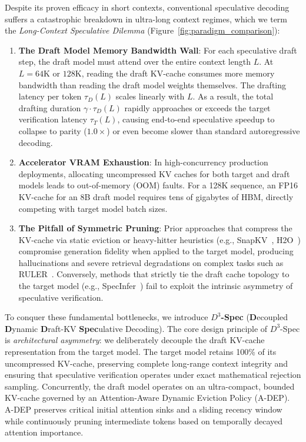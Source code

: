 \documentclass[runningheads]{llncs}
\begin{document}
Despite its proven efficacy in short contexts, conventional speculative decoding suffers a catastrophic breakdown in ultra-long context regimes, which we term the \textit{Long-Context Speculative Dilemma} (Figure~\ref{fig:paradigm_comparison}):
\begin{enumerate}
    \item \textbf{The Draft Model Memory Bandwidth Wall}: For each speculative draft step, the draft model must attend over the entire context length $L$. At $L = 64\text{K}$ or $128\text{K}$, reading the draft KV-cache consumes more memory bandwidth than reading the draft model weights themselves. The drafting latency per token $\tau_D(L)$ scales linearly with $L$. As a result, the total drafting duration $\gamma \cdot \tau_D(L)$ rapidly approaches or exceeds the target verification latency $\tau_T(L)$, causing end-to-end speculative speedup to collapse to parity ($1.0\times$) or even become slower than standard autoregressive decoding.
    \item \textbf{Accelerator VRAM Exhaustion}: In high-concurrency production deployments, allocating uncompressed KV caches for both target and draft models leads to out-of-memory (OOM) faults. For a 128K sequence, an FP16 KV-cache for an 8B draft model requires tens of gigabytes of HBM, directly competing with target model batch sizes.
    \item \textbf{The Pitfall of Symmetric Pruning}: Prior approaches that compress the KV-cache via static eviction or heavy-hitter heuristics (e.g., SnapKV~\cite{li2024snapkv}, H2O~\cite{zhang2024h2o}) compromise generation fidelity when applied to the target model, producing hallucinations and severe retrieval degradations on complex tasks such as RULER~\cite{hsieh2024ruler}. Conversely, methods that strictly tie the draft cache topology to the target model (e.g., SpecInfer~\cite{miao2024specinfer}) fail to exploit the intrinsic asymmetry of speculative verification.
\end{enumerate}

To conquer these fundamental bottlenecks, we introduce \textbf{$D^3$-Spec} (\textbf{D}ecoupled \textbf{D}ynamic \textbf{D}raft-KV \textbf{Spec}ulative Decoding). The core design principle of $D^3$-Spec is \textit{architectural asymmetry}: we deliberately decouple the draft KV-cache representation from the target model. The target model retains 100\% of its uncompressed KV-cache, preserving complete long-range context integrity and ensuring that speculative verification operates under exact mathematical rejection sampling. Concurrently, the draft model operates on an ultra-compact, bounded KV-cache governed by an Attention-Aware Dynamic Eviction Policy (A-DEP). A-DEP preserves critical initial attention sinks and a sliding recency window while continuously pruning intermediate tokens based on temporally decayed attention importance.
\end{document}
